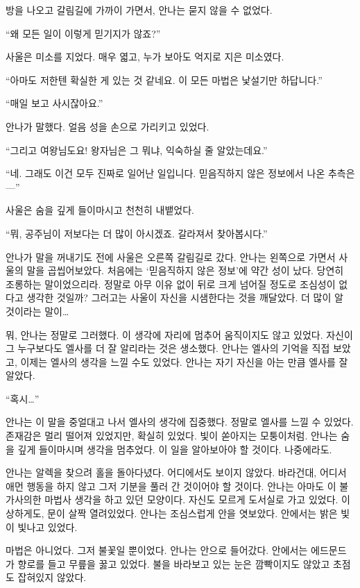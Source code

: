 방을 나오고 갈림길에 가까이 가면서, 안나는 묻지 않을 수 없었다.

``왜 모든 일이 이렇게 믿기지가 않죠?''

사울은 미소를 지었다. 매우 엷고, 누가 보아도 억지로 지은 미소였다.

``아마도 저한텐 확실한 게 있는 것 같네요. 이 모든 마법은 낯설기만 하답니다.''

``매일 보고 사시잖아요.''

안나가 말했다. 얼음 성을 손으로 가리키고 있었다.

``그리고 여왕님도요! 왕자님은 그 뭐냐, 익숙하실 줄 알았는데요.''

``네. 그래도 이건 모두 진짜로 일어난 일입니다. 믿음직하지 않은 정보에서 나온 추측은—''

사울은 숨을 깊게 들이마시고 천천히 내뱉었다.

``뭐, 공주님이 저보다는 더 많이 아시겠죠. 갈라져서 찾아봅시다.''

안나가 말을 꺼내기도 전에 사울은 오른쪽 갈림길로 갔다. 안나는 왼쪽으로 가면서 사울의 말을 곱씹어보았다. 처음에는 `믿음직하지 않은 정보'에 약간 성이 났다. 당연히 조롱하는 말이었으리라. 정말로 아무 이유 없이 뒤로 크게 넘어질 정도로 조심성이 없다고 생각한 것일까? 그러고는 사울이 자신을 시샘한다는 것을 깨달았다. 더 많이 알 것이라는 말이\ldots

뭐, 안나는 정말로 그러했다. 이 생각에 자리에 멈추어 움직이지도 않고 있었다. 자신이 그 누구보다도 엘사를 더 잘 알리라는 것은 생소했다. 안나는 엘사의 기억을 직접 보았고, 이제는 엘사의 생각을 느낄 수도 있었다. 안나는 자기 자신을 아는 만큼 엘사를 잘 알았다.

``혹시\ldots''

안나는 이 말을 중얼대고 나서 엘사의 생각에 집중했다. 정말로 엘사를 느낄 수 있었다. 존재감은 멀리 떨어져 있었지만, 확실히 있었다. 빛이 쏟아지는 모퉁이처럼. 안나는 숨을 깊게 들이마시며 생각을 멈추었다. 이 일을 알아보아야 할 것이다. 나중에라도.

안나는 알렉을 찾으려 홀을 돌아다녔다. 어디에서도 보이지 않았다. 바라건대, 어디서 애먼 행동을 하지 않고 그저 기분을 풀러 간 것이어야 할 것이다. 안나는 아마도 이 불가사의한 마법사 생각을 하고 있던 모양이다. 자신도 모르게 도서실로 가고 있었다. 이상하게도, 문이 살짝 열려있었다. 안나는 조심스럽게 안을 엿보았다. 안에서는 밝은 빛이 빛나고 있었다.

마법은 아니었다. 그저 불꽃일 뿐이었다. 안나는 안으로 들어갔다. 안에서는 에드문드가 향로를 들고 무릎을 꿇고 있었다. 불을 바라보고 있는 눈은 깜빡이지도 않았고 초점도 잡혀있지 않았다.

